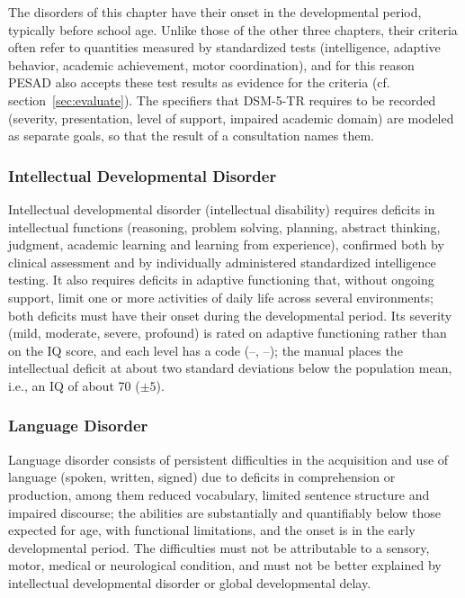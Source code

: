The disorders of this chapter have their onset in the developmental period,
typically before school age. Unlike those of the other three chapters, their
criteria often refer to quantities measured by standardized tests
(intelligence, adaptive behavior, academic achievement, motor coordination),
and for this reason PESAD also accepts these test results as evidence for the
criteria (cf. section~\ref{sec:evaluate}). The specifiers that DSM-5-TR requires
to be recorded (severity, presentation, level of support, impaired academic domain)
are modeled as separate goals, so that the result of a consultation names
them.

\subsubsection{Intellectual Developmental Disorder}

Intellectual developmental disorder (intellectual disability) requires deficits
in intellectual functions (reasoning, problem solving, planning, abstract
thinking, judgment, academic learning and learning from experience), confirmed
both by clinical assessment and by individually administered standardized
intelligence testing. It also requires deficits in adaptive functioning that,
without ongoing support, limit one or more activities of daily life across
several environments; both deficits must have their onset during the
developmental period. Its severity (mild, moderate, severe, profound) is rated
on adaptive functioning rather than on the IQ score, and each
level has a code (--, --); the manual places
the intellectual deficit at about two standard deviations below the
population mean, i.e., an IQ of about 70 ($\pm 5$).

\subsubsection{Language Disorder}

Language disorder consists of persistent difficulties in the acquisition and use
of language (spoken, written, signed) due to deficits in comprehension or
production, among them reduced vocabulary, limited sentence structure and
impaired discourse; the abilities are substantially and quantifiably below
those expected for age, with functional limitations, and the onset is in the
early developmental period. The difficulties must not be attributable to a
sensory, motor, medical or neurological condition, and must not be better
explained by intellectual developmental disorder or global developmental
delay.

